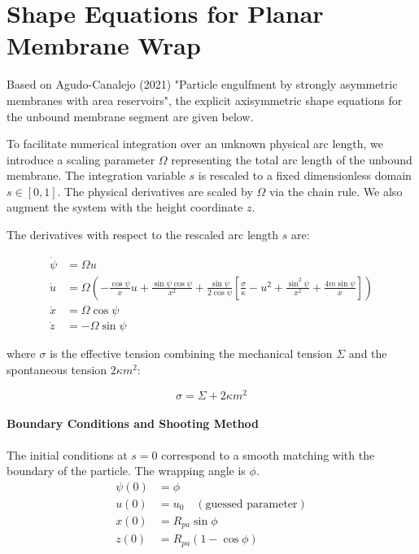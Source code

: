 \documentclass[11pt]{article}
\begin{document}
\section*{Shape Equations for Planar Membrane Wrap}

Based on Agudo-Canalejo (2021) "Particle engulfment by strongly asymmetric membranes with area reservoirs", the explicit axisymmetric shape equations for the unbound membrane segment are given below. 

To facilitate numerical integration over an unknown physical arc length, we introduce a scaling parameter $\Omega$ representing the total arc length of the unbound membrane. The integration variable $s$ is rescaled to a fixed dimensionless domain $s \in [0, 1]$. The physical derivatives are scaled by $\Omega$ via the chain rule. We also augment the system with the height coordinate $z$.

The derivatives with respect to the rescaled arc length $s$ are:

\begin{align}
\dot{\psi} &= \Omega u \\
\dot{u} &= \Omega \left( -\frac{\cos \psi}{x} u + \frac{\sin \psi \cos \psi}{x^2} + \frac{\sin \psi}{2 \cos \psi } \left[ \frac{\sigma}{\kappa} - u^2 + \frac{\sin^2 \psi}{x^2} + \frac{4 m \sin \psi}{x} \right] \right) \\
\dot{x} &= \Omega \cos \psi \\
\dot{z} &= -\Omega \sin \psi
\end{align}

where $\sigma$ is the effective tension combining the mechanical tension $\Sigma$ and the spontaneous tension $2 \kappa m^2$:

\begin{equation}
\sigma = \Sigma + 2 \kappa m^2
\end{equation}

\paragraph{Boundary Conditions and Shooting Method}
The initial conditions at $s=0$ correspond to a smooth matching with the boundary of the particle. The wrapping angle is $\phi$.
\begin{align*}
\psi(0) &= \phi \\
u(0) &= u_0 \quad (\text{guessed parameter}) \\
x(0) &= R_{pa} \sin \phi \\
z(0) &= R_{pa} (1 - \cos \phi)
\end{align*}
\end{document}
